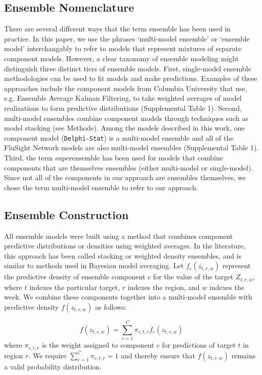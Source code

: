 \documentclass{article}\usepackage[]{graphicx}\usepackage[]{color}
\begin{document}
\subsection*{Ensemble Nomenclature}

There are several different ways that the term ensemble has been used in practice. 
In this paper, we use the phrases `multi-model ensemble' or `ensemble model' interchangably to refer to models that represent mixtures of separate component models. 
However, a clear taxonomy of ensemble modeling might distinguish three distinct tiers of ensemble models. 
First, single-model ensemble methodologies can be used to fit models and make predictions. 
Examples of these approaches include the component models from Columbia University that use, e.g. Ensemble Average Kalman Filtering, to take weighted averages of model realizations to form predictive distributions (Supplemental Table 1).
Second, multi-model ensembles combine component models through techniques such as model stacking (see Methods).
Among the models described in this work, one component model ({\tt Delphi-Stat}) is a multi-model ensemble and all of the FluSight Network models are also multi-model ensembles (Supplemental Table 1).
Third, the term superensemble has been used for models that combine components that are themselves ensembles (either multi-model or single-model)\cite{krishnamurti1999improved,Yamana2016}.
Since not all of the components in our approach are ensembles themselves, we chose the term multi-model ensemble to refer to our approach.

\subsection*{Ensemble Construction} \label{sec:stacking}

All ensemble models were built using a method that combines component predictive distributions or densities using weighted averages. In the literature, this approach has been called stacking\cite{Wolpert1992} or weighted density ensembles\cite{Ray2018}, and is similar to methods used in Bayesian model averaging\cite{Raftery2005}. Let $f_c(z_{t,r,w})$ represent the predictive density of ensemble component $c$ for the value of the target $Z_{t,r,w}$, where $t$ indexes the particular target, $r$ indexes the region, and $w$ indexes the week. We combine these components together into a multi-model ensemble with predictive density $f(z_{t,r,w})$ as follows:

\begin{equation}
f(z_{t,r,w})  = \sum^C_{c = 1} \pi_{c,t,r} f_c(z_{t,r,w})
\label{eq:enseq}
\end{equation}
where $\pi_{c, t, r}$ is the weight assigned to component $c$ for predictions of target $t$ in region $r$. We require $\sum^C_{c = 1} \pi_{c,t,r} = 1$ and thereby ensure that $f(z_{t,r,w})$ remains a valid probability distribution. 
\end{document}

